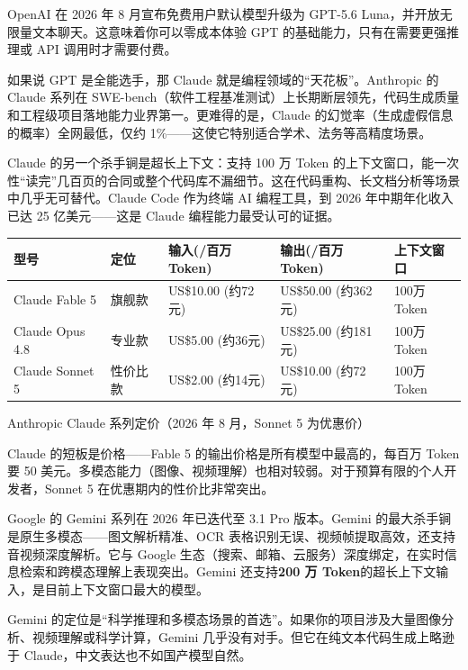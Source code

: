 OpenAI 在 2026 年 8 月宣布免费用户默认模型升级为 GPT-5.6 Luna，并开放无限量文本聊天。这意味着你可以零成本体验 GPT 的基础能力，只有在需要更强推理或 API 调用时才需要付费。


如果说 GPT 是全能选手，那 Claude 就是编程领域的“天花板”。Anthropic 的 Claude 系列在 SWE-bench（软件工程基准测试）上长期断层领先，代码生成质量和工程级项目落地能力业界第一。更难得的是，Claude 的幻觉率（生成虚假信息的概率）全网最低，仅约 1\%——这使它特别适合学术、法务等高精度场景。

Claude 的另一个杀手锏是超长上下文：支持 100 万 Token 的上下文窗口，能一次性“读完”几百页的合同或整个代码库不漏细节。这在代码重构、长文档分析等场景中几乎无可替代。Claude Code 作为终端 AI 编程工具，到 2026 年中期年化收入已达 25 亿美元——这是 Claude 编程能力最受认可的证据。

\begin{center}
\begin{tabularx}{\linewidth}{|X|X|X|X|X|}
\hline
\textbf{型号} & \textbf{定位} & \textbf{输入(/百万Token)} & \textbf{输出(/百万Token)} & \textbf{上下文窗口} \tabularnewline
\hline
Claude Fable 5 & 旗舰款 & US\$10.00 (约72元) & US\$50.00 (约362元) & 100万Token \tabularnewline
Claude Opus 4.8 & 专业款 & US\$5.00 (约36元) & US\$25.00 (约181元) & 100万Token \tabularnewline
Claude Sonnet 5 & 性价比款 & US\$2.00 (约14元) & US\$10.00 (约72元) & 100万Token \tabularnewline
\hline
\end{tabularx}
\end{center}

\begin{center}\small\color{gray}Anthropic Claude 系列定价（2026 年 8 月，Sonnet 5 为优惠价）\end{center}

Claude 的短板是价格——Fable 5 的输出价格是所有模型中最高的，每百万 Token 要 50 美元。多模态能力（图像、视频理解）也相对较弱。对于预算有限的个人开发者，Sonnet 5 在优惠期内的性价比非常突出。


Google 的 Gemini 系列在 2026 年已迭代至 3.1 Pro 版本。Gemini 的最大杀手锏是原生多模态——图文解析精准、OCR 表格识别无误、视频帧提取高效，还支持音视频深度解析。它与 Google 生态（搜索、邮箱、云服务）深度绑定，在实时信息检索和跨模态理解上表现突出。Gemini 还支持\textbf{200 万 Token}的超长上下文输入，是目前上下文窗口最大的模型。

Gemini 的定位是“科学推理和多模态场景的首选”。如果你的项目涉及大量图像分析、视频理解或科学计算，Gemini 几乎没有对手。但它在纯文本代码生成上略逊于 Claude，中文表达也不如国产模型自然。

